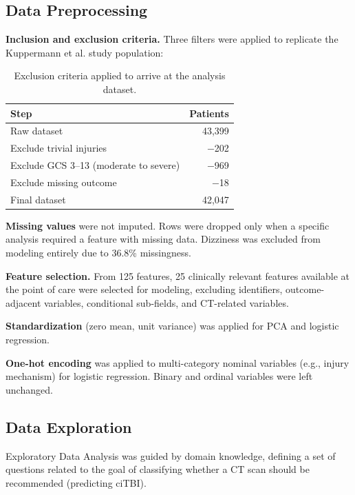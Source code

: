 \documentclass[11pt,letterpaper]{article}
\begin{document}
\subsection{Data Preprocessing}\label{data-preprocessing}

\textbf{Inclusion and exclusion criteria.} Three filters were applied to replicate the Kuppermann et al. study population:

\begin{table}[h]
\centering
\begin{tabularx}{\textwidth}{Xr}
\hline
Step & Patients \\
\hline
Raw dataset & 43,399 \\
Exclude trivial injuries & $-$202 \\
Exclude GCS 3--13 (moderate to severe) & $-$969 \\
Exclude missing outcome & $-$18 \\
\hline
Final dataset & 42,047 \\
\hline
\end{tabularx}
\caption{Exclusion criteria applied to arrive at the analysis dataset.}
\label{tab:exclusions}
\end{table}

\textbf{Missing values} were not imputed. Rows were dropped only when a specific analysis required a feature with missing data. Dizziness was excluded from modeling entirely due to 36.8\% missingness.

\textbf{Feature selection.} From 125 features, 25 clinically relevant features available at the point of care were selected for modeling, excluding identifiers, outcome-adjacent variables, conditional sub-fields, and CT-related variables.

\textbf{Standardization} (zero mean, unit variance) was applied for PCA and logistic regression. 

\textbf{One-hot encoding} was applied to multi-category nominal variables (e.g., injury mechanism) for logistic regression. Binary and ordinal variables were left unchanged.


\subsection{Data Exploration}\label{data-exploration}

Exploratory Data Analysis was guided by domain knowledge, defining a set of questions related to the goal of classifying whether a CT scan should be recommended (predicting ciTBI).
\end{document}
